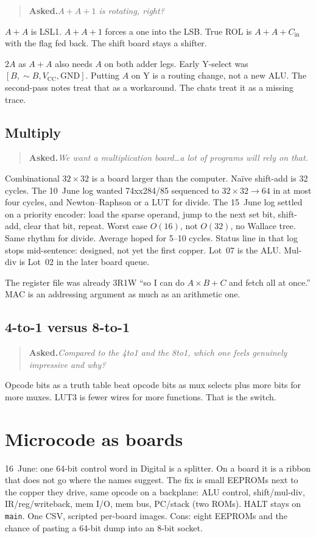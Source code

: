 \documentclass[11pt,openany]{book}
\newcommand{\asked}[1]{%
  \begin{quote}
  \noindent\textbf{Asked.}\quad\textit{#1}
  \end{quote}
}
\begin{document}
\asked{$A+A+1$ is rotating, right?}

$A+A$ is LSL1. $A+A+1$ forces a one into the LSB. True ROL is $A+A+C_{\mathrm{in}}$ with the flag fed back. The shift board stays a shifter.

$2A$ as $A+A$ also needs $A$ on both adder legs. Early Y-select was $[B,\sim B,V_{\mathrm{CC}},\mathrm{GND}]$. Putting $A$ on Y is a routing change, not a new ALU. The second-pass notes treat that as a workaround. The chats treat it as a missing trace.

\section{Multiply}

\asked{We want a multiplication board\ldots a lot of programs will rely on that.}

Combinational $32\times32$ is a board larger than the computer. Na\"ive shift-add is 32 cycles. The 10~June log wanted 74xx284/85 sequenced to $32\times32\to64$ in at most four cycles, and Newton--Raphson or a LUT for divide. The 15~June log settled on a priority encoder: load the sparse operand, jump to the next set bit, shift-add, clear that bit, repeat. Worst case $O(16)$, not $O(32)$, no Wallace tree. Same rhythm for divide. Average hoped for 5--10 cycles. Status line in that log stops mid-sentence: designed, not yet the first copper. Lot~07 is the ALU. Mul-div is Lot~02 in the later board queue.

The register file was already 3R1W ``so I can do $A\times B+C$ and fetch all at once.'' MAC is an addressing argument as much as an arithmetic one.

\section{4-to-1 versus 8-to-1}

\asked{Compared to the 4to1 and the 8to1, which one feels genuinely impressive and why?}

Opcode bits as a truth table beat opcode bits as mux selects plus more bits for more muxes. LUT3 is fewer wires for more functions. That is the switch.

\chapter{Microcode as boards}

16~June: one 64-bit control word in Digital is a splitter. On a board it is a ribbon that does not go where the names suggest. The fix is small EEPROMs next to the copper they drive, same opcode on a backplane: ALU control, shift/mul-div, IR/reg/writeback, mem I/O, mem bus, PC/stack (two ROMs). HALT stays on \texttt{main}. One CSV, scripted per-board images. Cons: eight EEPROMs and the chance of pasting a 64-bit dump into an 8-bit socket.
\end{document}
